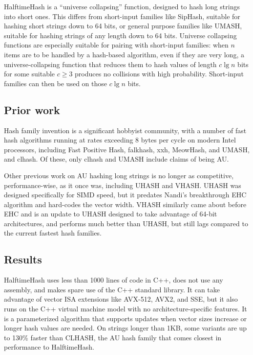 \documentclass[sigconf, nonacm]{acmart}
\begin{document}
HalftimeHash is a ``universe collapsing'' function, designed to hash long strings into short ones. \cite{linear-hash-functions,hashing-without-primes-revisited,cuckoo-journal}
This differs from short-input families like SipHash, suitable for hashing short strings down to 64 bits, or general purpose families like UMASH, suitable for hashing strings of any length down to 64 bits.
Universe collapsing functions are especially suitable for pairing with short-input families: when $n$ items are to be handled by a hash-based algorithm, even if they are very long, a universe-collapsing function that reduces them to hash values of length $c \lg n$ bits for some suitable $c \geq 3$ produces no collisions with high probability.
Short-input families can then be used on those $c \lg n$ bits. \cite{universe-collapse-linear-probing,siphash,tabulation,simple-hash-functions-work}

\subsection{Prior work}

Hash family invention is a significant hobbyist community, with a number of fast hash algorithms running at rates exceeding 8 bytes per cycle on modern Intel processors, including Fast Positive Hash, falk\-hash, xxh, Meow\-Hash, and UMASH, and cl\-hash. \cite{smhasher}
Of these, only cl\-hash and U\-MASH include claims of being AU.

Other previous work on AU hashing long strings is no longer as competitive, performance-wise, as it once was, including UHASH and VHASH.
UHASH was designed specifically for SIMD speed, but it predates Nandi's breakthrough EHC algorithm and hard-codes the vector width. \cite{umac}
VHASH similarly came about before EHC and is an update to UHASH designed to take advantage of 64-bit architectures, and performs much better than UHASH, but still lags compared to the current fastest hash families. \cite{vmac,smhasher}

\subsection{Results}

HalftimeHash uses less than 1000 lines of code in C++, does not use any assembly, and makes spare use of the C++ standard library.
It can take advantage of vector ISA extensions like AVX-512, AVX2, and SSE, but it also runs on the C++ virtual machine model with no architecture-specific features.
It is a parameterized algorithm that supports updates when vector sizes increase or longer hash values are needed.
On strings longer than 1KB, some variants are up to 130\% faster than CLHASH, the AU hash family that comes closest in performance to HalftimeHash.
\end{document}
